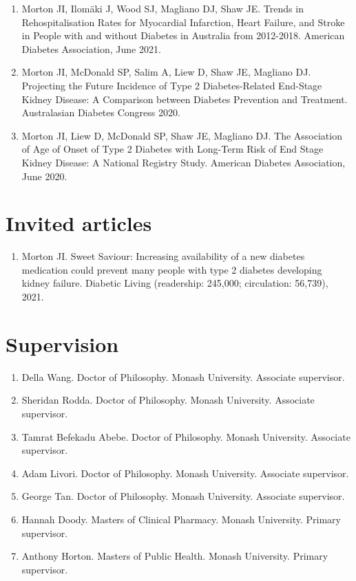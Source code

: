 \documentclass[11pt]{article}
\begin{document}
\begin{enumerate}
\item Morton JI, Ilom{\"a}ki J, Wood SJ, Magliano DJ, Shaw JE. 
Trends in Rehospitalisation Rates for Myocardial Infarction, Heart Failure, and Stroke in People with
and without Diabetes in Australia from 2012-2018. American Diabetes Association, June 2021.
\item Morton JI, McDonald SP, Salim A, Liew D, Shaw JE, Magliano DJ. 
Projecting the Future Incidence of Type 2 Diabetes-Related End-Stage Kidney Disease: 
A Comparison between Diabetes Prevention and Treatment. Australasian Diabetes Congress 2020.
\item Morton JI, Liew D, McDonald SP, Shaw JE, Magliano DJ. 
The Association of Age of Onset of Type 2 Diabetes with Long-Term Risk of End Stage Kidney Disease: 
A National Registry Study. American Diabetes Association, June 2020.  
\end{enumerate}

\section*{Invited articles}
\begin{enumerate}
\item Morton JI. Sweet Saviour: Increasing availability of a new diabetes medication could prevent many people with 
type 2 diabetes developing kidney failure. Diabetic Living (readership: 245,000; circulation: 56,739), 2021. 
\end{enumerate}


\section*{Supervision}
\begin{enumerate}
\item Della Wang. Doctor of Philosophy. Monash University. Associate supervisor. 
\item Sheridan Rodda. Doctor of Philosophy. Monash University. Associate supervisor. 
\item Tamrat Befekadu Abebe. Doctor of Philosophy. Monash University. Associate supervisor. 
\item Adam Livori. Doctor of Philosophy. Monash University. Associate supervisor. 
\item George Tan. Doctor of Philosophy. Monash University. Associate supervisor. 
\item Hannah Doody. Masters of Clinical Pharmacy. Monash University. Primary supervisor. 
\item Anthony Horton. Masters of Public Health. Monash University. Primary supervisor.
\end{enumerate}
\end{document}
